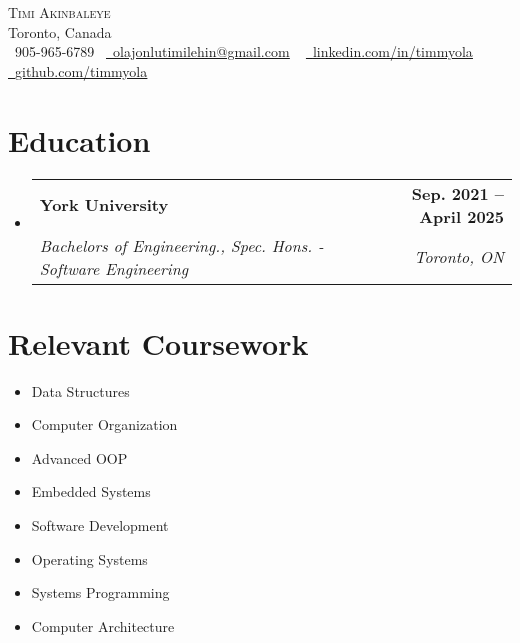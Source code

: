 \documentclass[letterpaper,11pt]{article}
\makeatletter
\newcommand{\resumeSubheading}[4]{
  \vspace{-2pt}\item
    \begin{tabular*}{1.0\textwidth}[t]{l@{\extracolsep{\fill}}r}
      \textbf{#1} & \textbf{\small #2} \\
      \textit{\small#3} & \textit{\small #4} \\
    \end{tabular*}\vspace{-7pt}
}
\newcommand{\resumeSubHeadingListStart}{\begin{itemize}[leftmargin=0.0in, label={}]}
\newcommand{\resumeSubHeadingListEnd}{\end{itemize}}
\makeatother
\begin{document}

\begin{center}
    {\Huge \scshape Timi Akinbaleye} \\ \vspace{1pt}
    Toronto, Canada \\ \vspace{1pt}
    \small \raisebox{-0.1\height}\faPhone\ 905-965-6789~ \href{mailto:olajonlutimilehin@gmail.com}{\raisebox{-0.2\height}\faEnvelope\  \underline{olajonlutimilehin@gmail.com}} ~ 
    \href{https://www.linkedin.com/in/timmyola/}{\raisebox{-0.2\height}\faLinkedin\ \underline{linkedin.com/in/timmyola}}  ~
    \href{https://github.com/timmyola}{\raisebox{-0.2\height}\faGithub\ \underline{github.com/timmyola}}
    \vspace{-8pt}
\end{center}


\section{Education}
  \resumeSubHeadingListStart
    \resumeSubheading
      {York University}{Sep. 2021 -- April 2025}
      {Bachelors of Engineering., Spec. Hons. - Software Engineering}{Toronto, ON}
  \resumeSubHeadingListEnd

\section{Relevant Coursework}
        \begin{multicols}{4}
            \begin{itemize}[itemsep=-5pt, parsep=3pt]
                \item\small Data Structures
                \item Computer Organization
                \item Advanced OOP
                \item Embedded Systems
                \item Software Development
                \item Operating Systems
                \item Systems Programming
                \item Computer Architecture
            \end{itemize}
        \end{multicols}
        \vspace*{2.0\multicolsep}
\end{document}
